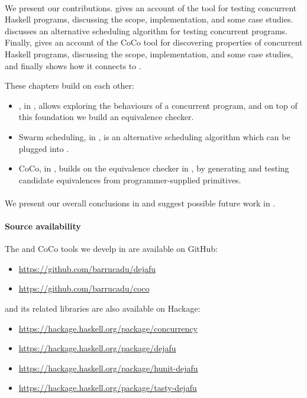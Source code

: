 \paragraph{}
We present our contributions.   gives an account of
the \dejafu{} tool for testing concurrent Haskell programs, discussing
the scope, implementation, and some case studies.
 discusses an alternative scheduling algorithm
for testing concurrent programs.  Finally,  gives an
account of the CoCo tool for discovering properties of concurrent
Haskell programs, discussing the scope, implementation, and some case
studies, and finally shows how it connects to \dejafu{}.

These chapters build on each other:

\begin{itemize}
\item \dejafu{}, in , allows exploring the behaviours
  of a concurrent program, and on top of this foundation we build an
  equivalence checker.
\item Swarm scheduling, in , is an alternative
  scheduling algorithm which can be plugged into \dejafu{}.
\item CoCo, in , builds on the equivalence checker in
  \dejafu{}, by generating and testing candidate equivalences from
  programmer-supplied primitives.
\end{itemize}

\paragraph{}
We present our overall conclusions in  and
suggest possible future work in .

\paragraph{Source availability}
The \dejafu{} and CoCo tools we develp in  are
available on GitHub:

\begin{itemize}
\item \url{https://github.com/barrucadu/dejafu}
\item \url{https://github.com/barrucadu/coco}
\end{itemize}

\noindent
\dejafu{} and its related libraries are also available on Hackage:

\begin{itemize}
\item \url{https://hackage.haskell.org/package/concurrency}
\item \url{https://hackage.haskell.org/package/dejafu}
\item \url{https://hackage.haskell.org/package/hunit-dejafu}
\item \url{https://hackage.haskell.org/package/tasty-dejafu}
\end{itemize}
